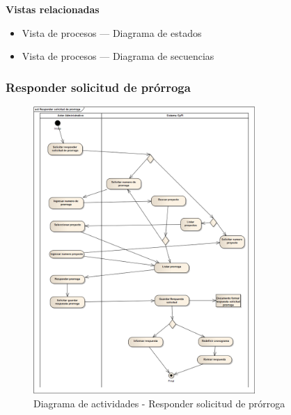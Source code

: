 \documentclass[12pt,oneside,letterpaper]{report}
\begin{document}
\textbf{Vistas relacionadas}
\begin{itemize}
\item Vista de procesos --- Diagrama de estados
\item Vista de procesos --- Diagrama de secuencias
\end{itemize}

\subsubsection{Responder solicitud de prórroga}

\begin{figure}[h!]
  \centering
    \includegraphics[width=0.75\textwidth]{./img/img12.png}
  \caption{Diagrama de actividades - Responder solicitud de prórroga}
\end{figure}
\end{document}
